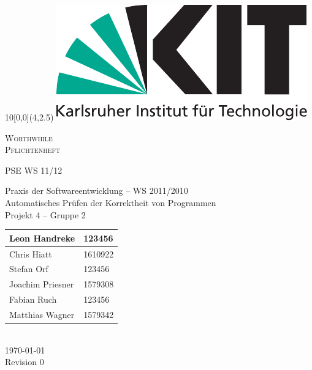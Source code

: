 
\newcommand{\diameter}{20}
\newcommand{\xone}{-15}
\newcommand{\xtwo}{160}
\newcommand{\yone}{15}
\newcommand{\ytwo}{-253}

\begin{titlepage}
	\begin{textblock}{10}[0,0](4,2.5)
		\includegraphics[width=.3\textwidth]{images/kit_logo_de_4c_positiv.pdf}
	\end{textblock}
	\vspace*{3.5cm}
	\begin{center}
		\fontsize{45}{50}\selectfont
  \textsc{Worthwhile} \\
  \textsc{Pflichtenheft}

	\vfill
		\LARGE
		PSE WS 11/12
  \vfill
 \newpage
 
 \null
 \vfill
 
 Praxis der Softwareentwicklung -- WS 2011/2010 \\
  Automatisches Prüfen der Korrektheit von Programmen \\
  Projekt 4 -- Gruppe 2 \\
  \medskip
  \vspace{2cm}
  \Large
  \begin{tabular}{|l|l|}
    \hline
    Leon Handreke & 123456 \\
    \hline
    Chris Hiatt & 1610922 \\
    \hline
    Stefan Orf & 123456 \\
    \hline
    Joachim Priesner & 1579308 \\
    \hline
    Fabian Ruch & 123456 \\
    \hline
    Matthias Wagner & 1579342 \\
    \hline
  \end{tabular}
  \vspace{2cm} \\
  \today \\
	Revision 0
	\end{center}
	
  \vfill

\end{titlepage}

